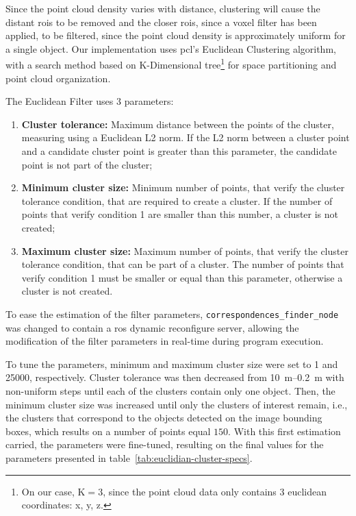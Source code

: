 Since the point cloud density varies with distance, clustering will cause the distant \acp{roi} to be removed and the closer \acp{roi}, since a voxel filter has been applied, to be filtered, since the point cloud density is approximately uniform for a single object. Our implementation uses \ac{pcl}'s Euclidean Clustering algorithm, with a search method based on K-Dimensional tree\footnote{On our case, K$=3$, since the point cloud data only contains 3 euclidean coordinates: x, y, z.} for space partitioning and point cloud organization.

The Euclidean Filter uses 3 parameters:

\begin{enumerate}
	\label{enum:object-detection:cluster-parameters}
	\item \textbf{Cluster tolerance:} Maximum distance between the points of the cluster, measuring using a Euclidean L2 norm. If the L2 norm between a cluster point and a candidate cluster point is greater than this parameter, the candidate point is not part of the cluster;
	\item \textbf{Minimum cluster size:} Minimum number of points, that verify the cluster tolerance condition, that are required to create a cluster. If the number of points that verify condition 1 are smaller than this number, a cluster is not created;
	\item \textbf{Maximum cluster size:} Maximum number of points, that verify the cluster tolerance condition, that can be part of a cluster. The number of points that verify condition 1 must be smaller or equal than this parameter, otherwise a cluster is not created.
\end{enumerate}

To ease the estimation of the filter parameters, \texttt{correspondences\_finder\_node} was changed to contain a \ac{ros} dynamic reconfigure server, allowing the modification of the filter parameters in real-time during program execution. 

To tune the parameters, minimum and maximum cluster size were set to 1 and 25000, respectively. Cluster tolerance was then decreased from \SIrange{10}{0.2}{\meter} with non-uniform steps until each of the clusters contain only one object. Then, the minimum cluster size was increased until only the clusters of interest remain, i.e., the clusters that correspond to the objects detected on the image bounding boxes, which results on a number of points equal $150$. With this first estimation carried, the parameters were fine-tuned, resulting on the final values for the parameters presented in table~\ref{tab:euclidian-cluster-specs}.

